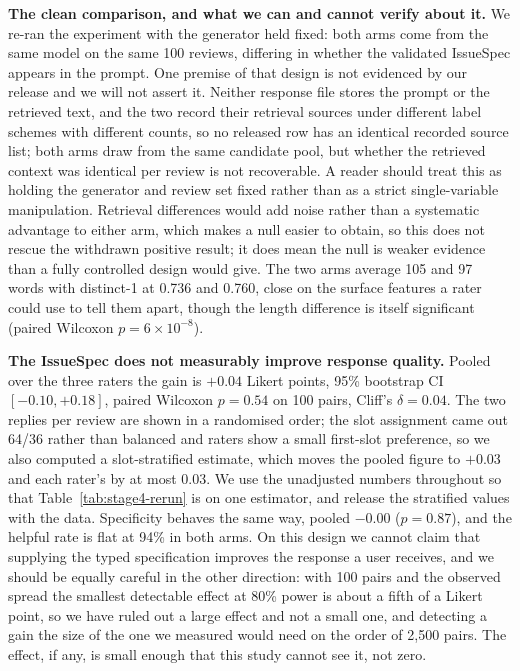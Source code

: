 \documentclass[preprint,12pt]{elsarticle}
\begin{document}
\textbf{The clean comparison, and what we can and cannot verify about it.} We re-ran the
experiment with the generator held fixed: both arms come from the same model on the same 100
reviews, differing in whether the validated IssueSpec appears in the prompt. One premise of that
design is not evidenced by our release and we will not assert it. Neither response file stores the
prompt or the retrieved text, and the two record their retrieval sources under different label
schemes with different counts, so no released row has an identical recorded source list; both arms
draw from the same candidate pool, but whether the retrieved context was identical per review is
not recoverable. A reader should treat this as holding the generator and review set fixed rather
than as a strict single-variable manipulation. Retrieval differences would add noise rather than a
systematic advantage to either arm, which makes a null easier to obtain, so this does not rescue
the withdrawn positive result; it does mean the null is weaker evidence than a fully controlled
design would give. The two arms average 105 and 97 words with distinct-1 at 0.736 and 0.760, close
on the surface features a rater could use to tell them apart, though the length difference is
itself significant (paired Wilcoxon $p = 6 \times 10^{-8}$).

\textbf{The IssueSpec does not measurably improve response quality.} Pooled over the three raters
the gain is $+0.04$ Likert points, 95\% bootstrap CI $[-0.10, +0.18]$, paired Wilcoxon $p = 0.54$
on 100 pairs, Cliff's $\delta = 0.04$. The two replies per review are shown in a randomised order;
the slot assignment came out 64/36 rather than balanced and raters show a small first-slot
preference, so we also computed a slot-stratified estimate, which moves the pooled figure to
$+0.03$ and each rater's by at most 0.03. We use the unadjusted numbers throughout so that
Table~\ref{tab:stage4-rerun} is on one estimator, and release the stratified values with the data.
Specificity behaves the same way, pooled $-0.00$ ($p = 0.87$), and the helpful rate is flat at
94\% in both arms. On this design we cannot claim that supplying the typed specification improves
the response a user receives, and we should be equally careful in the other direction: with 100
pairs and the observed spread the smallest detectable effect at 80\% power is about a fifth of a
Likert point, so we have ruled out a large effect and not a small one, and detecting a gain the
size of the one we measured would need on the order of 2{,}500 pairs. The effect, if any, is small
enough that this study cannot see it, not zero.
\end{document}
